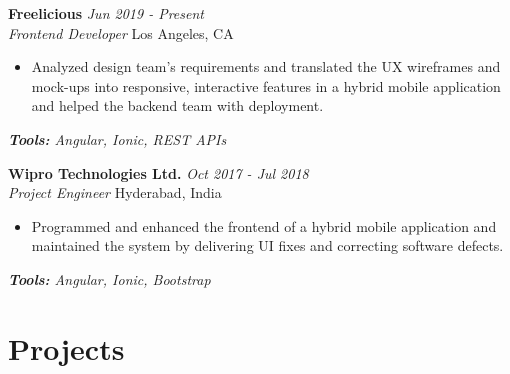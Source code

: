 \documentclass[letterpaper,10pt]{article}
\newcommand{\organization}[4]{
    \vspace{1.5pt}
    \textbf{#1} \hfill{\emph{#2}} \\
    \emph{#3} \hfill{#4} \\
    \vspace{3pt}
}
\newcommand{\toolsused}[1]{
    \vspace{1.5pt}
    \emph{#1}\\
    \vspace{3pt}
}
\newcommand{\bulletsBegin}{
    \vspace{1pt}
    \begin{minipage}{17.6cm}
    \begin{itemize}[leftmargin=0.6cm]
    \setlength\itemsep{-0.1em}
}
\newcommand{\bulletsEnd}{
    \end{itemize}\vspace{0pt}
    \end{minipage}
}
\begin{document}
        \organization{Freelicious}{Jun 2019 - Present}
        {Frontend Developer}{Los Angeles, CA}
        \bulletsBegin
		\item Analyzed design team's requirements and translated the UX wireframes and mock-ups into responsive, interactive features in a hybrid mobile application and helped the backend team with deployment.
        \bulletsEnd
	\vspace{-8pt}
        \toolsused{\textbf{Tools:} Angular, Ionic, REST APIs}

        \organization{Wipro Technologies Ltd.}{Oct 2017 - Jul 2018}
        {Project Engineer}{Hyderabad, India}
        \bulletsBegin
		\item Programmed and enhanced the frontend of a hybrid mobile application and maintained the system by delivering UI fixes and correcting software defects.
            \vspace{-2pt}
        \bulletsEnd
	\vspace{-7pt}
        \toolsused{\textbf{Tools:} Angular, Ionic, Bootstrap}
	\vspace{5pt}

    \section{Projects}

    
\end{document}
